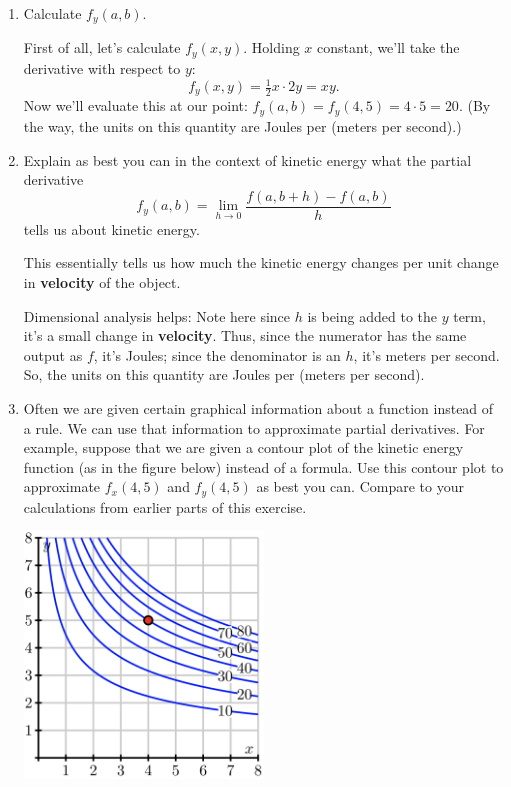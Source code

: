 \documentclass[10pt]{article}
\newenvironment{red}{\color{red}}{\ignorespacesafterend}
\begin{document}
\begin{enumerate}[leftmargin=0pt]
\begin{enumerate}
        \item Calculate $f_y(a,b)$.
        
        \begin{red}
            First of all, let's calculate $f_y(x,y).$ Holding $x$ constant, we'll take the derivative with respect to $y$:
            \[f_y(x,y) = \tfrac{1}{2}x\cdot 2y = xy.\]
            Now we'll evaluate this at our point: $f_y(a, b) = f_y(4, 5) = 4 \cdot 5 = 20.$
            (By the way, the units on this quantity are Joules per (meters per second).)
            
            
        \end{red}
        
        \item Explain as best you can in the context of kinetic energy what the partial derivative
        \[f_{y}(a, b)=\lim _{h \rightarrow 0} \frac{f(a, b+h)-f(a, b)}{h}\]
        tells us about kinetic energy.
        
        \begin{red}
            This essentially tells us how much the kinetic energy changes per unit change in \textbf{velocity} of the object. 
            
            Dimensional analysis helps: Note here since $h$ is being added to the $y$ term, it's a small change in \textbf{velocity}. Thus, since the numerator has the same output as $f$, it's Joules; since the denominator is an $h$, it's meters per second. So, the units on this quantity are Joules per (meters per second).
        \end{red}
        
        \item Often we are given certain graphical information about a function instead of a rule. We can use that information to approximate partial derivatives. For example, suppose that we are given a contour plot of the kinetic energy function (as in the figure below) instead of a formula. Use this contour plot to approximate $f_x(4, 5)$ and $f_y(4, 5)$ as best you can. Compare to your calculations from earlier parts of this exercise.
        
        \begin{center}
            \includegraphics[width=0.5\textwidth]{../images/10-2-14.png}
        \end{center}
        

\end{enumerate}
\end{enumerate}
\end{document}
